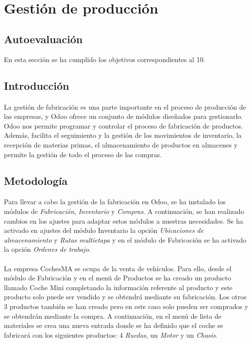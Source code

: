 
\section{Gestión de producción}
\subsection{Autoevaluación}
En esta sección se ha cumplido los objetivos correspondientes al 10.
\subsection{Introducción}
\paragraph{}
La gestión de fabricación es una parte importante en el proceso de producción de las empresas, y Odoo ofrece un conjunto de módulos diseñados para gestionarlo. Odoo nos permite programar y controlar el proceso de fabricación de productos. Además, facilita el seguimiento y la gestión de los movimientos de inventario, la recepción de materias primas, el almacenamiento de productos en almacenes y permite la gestión de todo el proceso de las compras.
\subsection{Metodología}
\paragraph{}
Para llevar a cabo la gestión de la fabricación en Odoo, se ha instalado los módulos de \textit{Fabricación}, \textit{Inventario} y \textit{Compras}. A continuación, se han realizado cambios en los ajustes para adaptar estos módulos a nuestras necesidades. Se ha activado en ajustes del módulo Inventario la opción \textit{Ubicaciones de almacenamiento} y \textit{Rutas multietapa} y en el módulo de Fabricación se ha activado la opción \textit{Ordenes de trabajo}. 
\paragraph{}
La empresa CochesMA se ocupa de la venta de vehículos. Para ello, desde el módulo de Fabricación y en el menú de Productos se ha creado un producto llamado Coche Mini completando la información referente al producto y este producto solo puede ser vendido y se obtendrá mediante su fabricación. Los otros 3 productos también se han creado pero en este caso solo pueden ser comprados y se obtendrán mediante la compra. A continuación, en el menú de lista de materiales se crea una nueva entrada donde se ha definido que el coche se fabricará con los siguientes productos: 4 \textit{Ruedas}, un \textit{Motor} y un \textit{Chasis}. 
